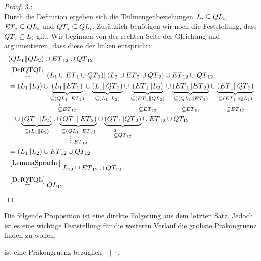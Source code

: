 \begin{proof}
  3.:\\
  Durch die Definition ergeben sich die Teilmengenbeziehungen $L_i\subseteq
  QL{}_i$, $ET{}_i\subseteq QL{}_i$ und $QT{}_i\subseteq QL{}_i$.
  Zusätzlich benötigen wir noch die Feststellung, dass $QT{}_i \subseteq L_i$
  gilt. Wir beginnen von der rechten Seite der
  Gleichung und argumentieren, dass diese der linken entspricht:
  \begin{align*}
    &(QL{}_1\| QL{}_2)\cup ET{}_{12}\cup QT{}_{12}\\
    &\overset{\ref{DefQTQL}}{=}(L_1\cup ET{}_1\cup QT{}_1)\|(L_2\cup
    ET{}_2\cup QT{}_2)\cup ET{}_{12}\cup QT{}_{12}\\
    &=(L_1\|L_2)
    \cup \underset{\overset{1.}{\subseteq} ET{}_{12}}{\underset{\subseteq
    (QL{}_1\|ET{}_2)}{\underbrace{(L_1\|ET{}_2)}}}
    \cup \underset{\subseteq (L_1\|L_2)}{\underbrace{(L_1\|QT{}_2)}}
    \cup \underset{\overset{1.}{\subseteq} ET{}_{12}}{\underset{\subseteq
    (ET{}_1\|QL{}_2)}{\underbrace{(ET{}_1\|L_2)}}}
    \cup \underset{\overset{1.}{\subseteq} ET{}_{12}}{\underset{\subseteq
    (QL{}_1\|ET{}_2)}{\underbrace{(ET{}_1\|ET{}_2)}}}
    \cup \underset{\overset{1.}{\subseteq} ET{}_{12}}{\underset{\subseteq
    (ET{}_1\|QL{}_2)}{\underbrace{(ET{}_1\|QT{}_2)}}}\\
    &\phantom{=}\cup \underset{\subseteq
    (L_1\|L_2)}{\underbrace{(QT{}_1\|L_2)}}
    \cup \underset{\overset{1.}{\subseteq} ET{}_{12}}{\underset{\subseteq
    (QL{}_1\|ET{}_2)}{\underbrace{(QT{}_1\|ET{}_2)}}}
    \cup \underset{\overset{2.}{\subseteq}
    QT{}_{12}}{\underbrace{(QT{}_1\|QT{}_2)}}
    \cup ET{}_{12}\cup QT_{12}\\
    &=(L_1\|L_2) \cup ET{}_{12}\cup QT_{12}\\
    &\overset{\ref{LemmaSprache}}{=}L_{12}\cup ET{}_{12}\cup QT_{12}\\
    &\overset{\ref{DefQTQL}}{=}QL{}_{12}
  \end{align*}
\end{proof}

Die folgende Proposition ist eine direkte Folgerung aus dem letzten Satz.
Jedoch ist es eine wichtige Feststellung für die weiteren Verlauf die gröbste
Präkongruenz finden zu wollen.

\begin{prop}[Präkongruenz]
  \label{propQuiPrae}
  \QRel{} ist eine Präkongruenz bezüglich $\cdot\|\cdot$.
\end{prop}

